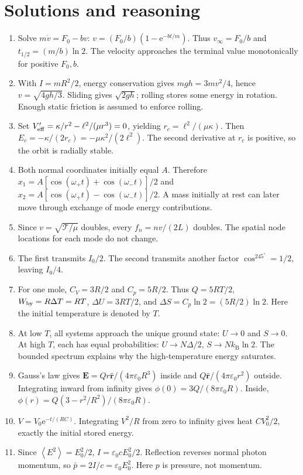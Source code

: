 \documentclass[11pt,oneside]{book}
\newcommand{\ee}{\mathrm{e}}
\newcommand{\vect}[1]{\boldsymbol{#1}}
\newcommand{\avg}[1]{\left\langle #1\right\rangle}
\newcommand{\kb}{k_{\mathrm B}}
\newcommand{\eps}{\varepsilon_0}
\theoremstyle{reviewstyle}
\begin{document}
\chapter{Solutions and reasoning}
\begin{enumerate}
\item Solve $m\dot v=F_0-bv$: $v=(F_0/b)(1-\ee^{-bt/m})$. Thus $v_\infty=F_0/b$ and $t_{1/2}=(m/b)\ln2$. The velocity approaches the terminal value monotonically for positive $F_0,b$.
\item With $I=mR^2/2$, energy conservation gives $mgh=3mv^2/4$, hence $v=\sqrt{4gh/3}$. Sliding gives $\sqrt{2gh}$; rolling stores some energy in rotation. Enough static friction is assumed to enforce rolling.
\item Set $V_{\rm eff}'=\kappa/r^2-\ell^2/(\mu r^3)=0$, yielding $r_c=\ell^2/(\mu\kappa)$. Then $E_c=-\kappa/(2r_c)=-\mu\kappa^2/(2\ell^2)$. The second derivative at $r_c$ is positive, so the orbit is radially stable.
\item Both normal coordinates initially equal $A$. Therefore $x_1=A[\cos(\omega_+t)+\cos(\omega_-t)]/2$ and $x_2=A[\cos(\omega_+t)-\cos(\omega_-t)]/2$. A mass initially at rest can later move through exchange of mode energy contributions.
\item Since $v=\sqrt{\mathcal T/\mu}$ doubles, every $f_n=nv/(2L)$ doubles. The spatial node locations for each mode do not change.
\item The first transmits $I_0/2$. The second transmits another factor $\cos^245^\circ=1/2$, leaving $I_0/4$.
\item For one mole, $C_V=3R/2$ and $C_p=5R/2$. Thus $Q=5RT/2$, $W_{\rm by}=R\Delta T=RT$, $\Delta U=3RT/2$, and $\Delta S=C_p\ln2=(5R/2)\ln2$. Here the initial temperature is denoted by $T$.
\item At low $T$, all systems approach the unique ground state: $U\to0$ and $S\to0$. At high $T$, each has equal probabilities: $U\to N\Delta/2$, $S\to N\kb\ln2$. The bounded spectrum explains why the high-temperature energy saturates.
\item Gauss's law gives $\vect E=Qr\hat{\vect r}/(4\pi\eps R^3)$ inside and $Q\hat{\vect r}/(4\pi\eps r^2)$ outside. Integrating inward from infinity gives $\phi(0)=3Q/(8\pi\eps R)$. Inside, $\phi(r)=Q(3-r^2/R^2)/(8\pi\eps R)$.
\item $V=V_0\ee^{-t/(RC)}$. Integrating $V^2/R$ from zero to infinity gives heat $CV_0^2/2$, exactly the initial stored energy.
\item Since $\avg{E^2}=E_0^2/2$, $I=\eps cE_0^2/2$. Reflection reverses normal photon momentum, so $\bar p=2I/c=\eps E_0^2$. Here $p$ is pressure, not momentum.

\end{enumerate}
\end{document}
